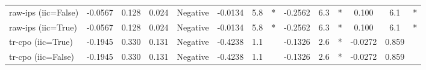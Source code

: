 \begin{table}[htbp]
\begin{tabular}{l|ccccccccccccc}
raw-ips (iic=False) & -0.0567 & 0.128 & 0.024 & Negative & -0.0134 & 5.8 & * & -0.2562 & 6.3 & * & 0.100 & 6.1 & * \\
raw-ips (iic=True) & -0.0567 & 0.128 & 0.024 & Negative & -0.0134 & 5.8 & * & -0.2562 & 6.3 & * & 0.100 & 6.1 & * \\
tr-cpo (iic=True) & -0.1945 & 0.330 & 0.131 & Negative & -0.4238 & 1.1 &  & -0.1326 & 2.6 & * & -0.0272 & 0.859 &  \\
tr-cpo (iic=False) & -0.1945 & 0.330 & 0.131 & Negative & -0.4238 & 1.1 &  & -0.1326 & 2.6 & * & -0.0272 & 0.859 &  \\
\bottomrule
\end{tabular}
\end{table}